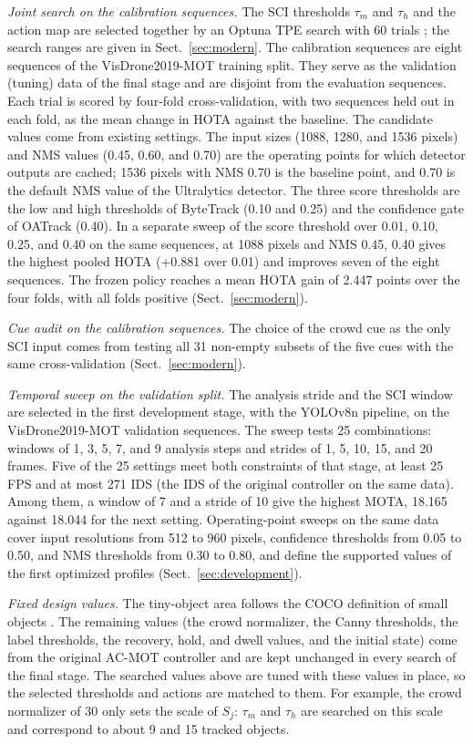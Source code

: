 \documentclass[pdflatex,sn-mathphys-num,iicol]{sn-jnl}
\begin{document}
\emph{Joint search on the calibration sequences.} The SCI thresholds $\tau_m$
and $\tau_h$ and the action map are selected together by an Optuna TPE search
with 60 trials \cite{akiba2019optuna}; the search ranges are given in
Sect.~\ref{sec:modern}. The calibration sequences are eight
sequences of the VisDrone2019-MOT training split. They serve as the validation
(tuning) data of the final stage and are disjoint from the evaluation
sequences. Each trial is scored by four-fold cross-validation, with two
sequences held out in each fold, as the mean change in HOTA against the
baseline. The candidate values come from existing settings. The input sizes
(1088, 1280, and 1536 pixels) and NMS values (0.45, 0.60, and 0.70) are the
operating points for which detector outputs are cached; 1536 pixels
with NMS 0.70 is the baseline point, and 0.70 is the default NMS value of the
Ultralytics detector. The three score thresholds are the low and high
thresholds of ByteTrack (0.10 and 0.25) and the confidence gate of OATrack
(0.40). In a separate sweep of the score threshold over 0.01, 0.10, 0.25, and
0.40 on the same sequences, at 1088 pixels and NMS 0.45, 0.40 gives the highest
pooled HOTA (+0.881 over 0.01) and improves seven of the eight sequences. The frozen policy reaches a mean HOTA
gain of 2.447 points over the four folds, with all folds positive
(Sect.~\ref{sec:modern}).

\emph{Cue audit on the calibration sequences.} The choice of the crowd cue as
the only SCI input comes from testing all 31 non-empty subsets of the five
cues with the same cross-validation (Sect.~\ref{sec:modern}).

\emph{Temporal sweep on the validation split.} The analysis stride and the
SCI window are selected in the first development stage, with the YOLOv8n
pipeline, on the VisDrone2019-MOT validation sequences. The sweep tests 25
combinations: windows of 1, 3, 5, 7, and 9 analysis steps and strides of 1, 5,
10, 15, and 20 frames. Five of the 25 settings meet both constraints of that
stage, at least 25 FPS and at most 271 IDS (the IDS of the original controller
on the same data). Among them, a window of 7 and a stride of 10 give the
highest MOTA, 18.165 against 18.044 for the next setting. Operating-point
sweeps on the same data cover input resolutions from 512 to 960 pixels,
confidence thresholds from 0.05 to 0.50, and NMS thresholds from 0.30 to 0.80,
and define the supported values of the first optimized profiles
(Sect.~\ref{sec:development}).

\emph{Fixed design values.} The tiny-object area follows the COCO definition
of small objects \cite{lin2014coco}. The remaining values (the crowd
normalizer, the Canny thresholds, the label thresholds, the recovery, hold,
and dwell values, and the initial state) come from the original AC-MOT
controller and are kept unchanged in every search of the final stage. The
searched values above
are tuned with these values in place, so the selected thresholds and actions
are matched to them. For example, the crowd normalizer of 30 only sets the
scale of $S_j$: $\tau_m$ and $\tau_h$ are searched on this scale and
correspond to about 9 and 15 tracked objects.
\end{document}
